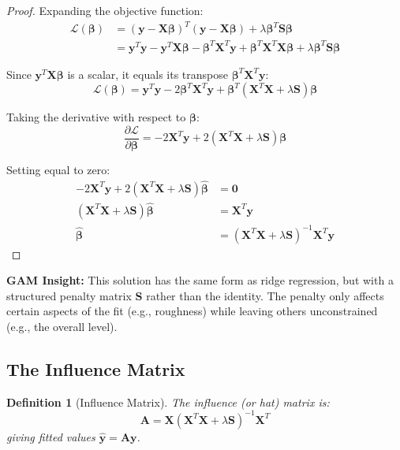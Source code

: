 \documentclass[12pt]{article}
\newtheorem{definition}{Definition}
\begin{document}
\begin{proof}
Expanding the objective function:
\begin{align}
\mathcal{L}(\bm{\beta}) &= (\mathbf{y} - \mathbf{X}\bm{\beta})^T(\mathbf{y} - \mathbf{X}\bm{\beta}) + \lambda \bm{\beta}^T \mathbf{S} \bm{\beta} \\
&= \mathbf{y}^T\mathbf{y} - \mathbf{y}^T\mathbf{X}\bm{\beta} - \bm{\beta}^T\mathbf{X}^T\mathbf{y} + \bm{\beta}^T\mathbf{X}^T\mathbf{X}\bm{\beta} + \lambda \bm{\beta}^T \mathbf{S} \bm{\beta}
\end{align}

Since $\mathbf{y}^T\mathbf{X}\bm{\beta}$ is a scalar, it equals its transpose $\bm{\beta}^T\mathbf{X}^T\mathbf{y}$:
\begin{equation}
\mathcal{L}(\bm{\beta}) = \mathbf{y}^T\mathbf{y} - 2\bm{\beta}^T\mathbf{X}^T\mathbf{y} + \bm{\beta}^T(\mathbf{X}^T\mathbf{X} + \lambda\mathbf{S})\bm{\beta}
\end{equation}

Taking the derivative with respect to $\bm{\beta}$:
\begin{equation}
\frac{\partial \mathcal{L}}{\partial \bm{\beta}} = -2\mathbf{X}^T\mathbf{y} + 2(\mathbf{X}^T\mathbf{X} + \lambda\mathbf{S})\bm{\beta}
\end{equation}

Setting equal to zero:
\begin{align}
-2\mathbf{X}^T\mathbf{y} + 2(\mathbf{X}^T\mathbf{X} + \lambda\mathbf{S})\hat{\bm{\beta}} &= \mathbf{0} \\
(\mathbf{X}^T\mathbf{X} + \lambda\mathbf{S})\hat{\bm{\beta}} &= \mathbf{X}^T\mathbf{y} \\
\hat{\bm{\beta}} &= (\mathbf{X}^T\mathbf{X} + \lambda\mathbf{S})^{-1}\mathbf{X}^T\mathbf{y}
\end{align}
\end{proof}

\textbf{GAM Insight:} This solution has the same form as ridge regression, but with a structured penalty matrix $\mathbf{S}$ rather than the identity. The penalty only affects certain aspects of the fit (e.g., roughness) while leaving others unconstrained (e.g., the overall level).

\subsection{The Influence Matrix}

\begin{definition}[Influence Matrix]
The influence (or hat) matrix is:
\begin{equation}
\mathbf{A} = \mathbf{X}(\mathbf{X}^T\mathbf{X} + \lambda\mathbf{S})^{-1}\mathbf{X}^T
\end{equation}
giving fitted values $\hat{\mathbf{y}} = \mathbf{A}\mathbf{y}$.
\end{definition}
\end{document}
